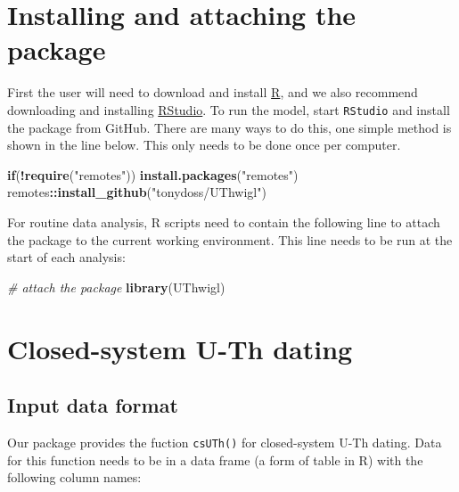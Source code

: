 \documentclass[]{elsarticle} %
\newenvironment{Shaded}{\begin{snugshade}}{\end{snugshade}}
\newcommand{\CommentTok}[1]{\textcolor[rgb]{0.56,0.35,0.01}{\textit{#1}}}
\newcommand{\ControlFlowTok}[1]{\textcolor[rgb]{0.13,0.29,0.53}{\textbf{#1}}}
\newcommand{\KeywordTok}[1]{\textcolor[rgb]{0.13,0.29,0.53}{\textbf{#1}}}
\newcommand{\NormalTok}[1]{#1}
\newcommand{\OperatorTok}[1]{\textcolor[rgb]{0.81,0.36,0.00}{\textbf{#1}}}
\newcommand{\StringTok}[1]{\textcolor[rgb]{0.31,0.60,0.02}{#1}}
\begin{document}
\hypertarget{installing-and-attaching-the-package}{%
\section{Installing and attaching the package}\label{installing-and-attaching-the-package}}

First the user will need to download and install \href{https://www.r-project.org/}{R}, and we also recommend downloading and installing \href{https://www.rstudio.com/}{RStudio}. To run the model, start \texttt{RStudio} and install the package from GitHub. There are many ways to do this, one simple method is shown in the line below. This only needs to be done once per computer.

\begin{Shaded}
\begin{Highlighting}[]
\ControlFlowTok{if}\NormalTok{(}\OperatorTok{!}\KeywordTok{require}\NormalTok{(}\StringTok{"remotes"}\NormalTok{)) }\KeywordTok{install.packages}\NormalTok{(}\StringTok{"remotes"}\NormalTok{)}
\NormalTok{remotes}\OperatorTok{::}\KeywordTok{install_github}\NormalTok{(}\StringTok{"tonydoss/UThwigl"}\NormalTok{)}
\end{Highlighting}
\end{Shaded}

For routine data analysis, R scripts need to contain the following line to attach the package to the current working environment. This line needs to be run at the start of each analysis:

\begin{Shaded}
\begin{Highlighting}[]
\CommentTok{# attach the package}
\KeywordTok{library}\NormalTok{(UThwigl)}
\end{Highlighting}
\end{Shaded}

\newpage

\hypertarget{closed-system-u-th-dating}{%
\section{Closed-system U-Th dating}\label{closed-system-u-th-dating}}

\hypertarget{input-data-format}{%
\subsection{Input data format}\label{input-data-format}}

Our package provides the fuction \texttt{csUTh()} for closed-system U-Th dating. Data for this function needs to be in a data frame (a form of table in R) with the following column names:
\end{document}

